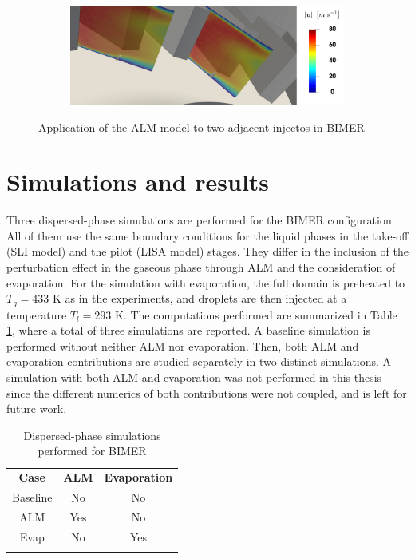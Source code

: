 \begin{figure}[ht]
\centering
\begin{subfigure}[b]{1.0\textwidth}
	\centering
   \includegraphics[scale=0.18]{./part3_applications/figures_ch9_lagrangian/turbulent_structures/ALM_revolution}
\end{subfigure}
   \caption{Application of the ALM model to two adjacent injectos in BIMER}
\label{fig:BIMER_ALM_revolution}
\end{figure}

\section{Simulations and results}
\label{sec:BIMER_LGS_simus_and_results}

Three dispersed-phase simulations are performed for the BIMER configuration. All of them use the same boundary conditions for the liquid phases in the take-off (SLI model) and the pilot (LISA model) stages. They differ in the inclusion of the perturbation effect in the gaseous phase through ALM and the consideration of evaporation. For the simulation with evaporation, the full domain is preheated to $T_g = 433$ K as in the experiments, and droplets are then injected at a temperature $T_l = 293 $ K.  The computations performed are summarized in Table \ref{tab:BIMER_dispersed_phase_simulations_performed}, where a total of three simulations are reported. A baseline simulation is performed without neither ALM nor evaporation. Then, both ALM and evaporation contributions are studied separately in two distinct simulations. A simulation with both ALM and evaporation was not performed in this thesis since the different numerics of both contributions were not coupled, and is left for future work. %

\begin{table}[!h]
\centering
\caption{Dispersed-phase simulations performed for BIMER}
\begin{tabular}{ccc}
\thickhline
\textbf{Case} & \textbf{ALM} & \textbf{Evaporation} \\
\thickhline
Baseline & No & No \\
ALM & Yes & No \\
Evap & No & Yes \\%
\thickhline
\end{tabular}
\label{tab:BIMER_dispersed_phase_simulations_performed}
\end{table}

